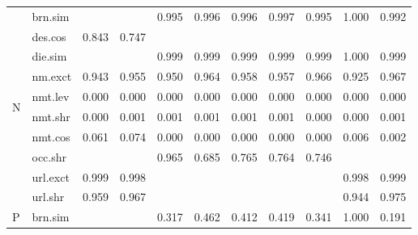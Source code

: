 \documentclass[epsfig,a4paper,11pt,titlepage,twoside,openany]{book}
\begin{document}
\begin{table}[H]
\begin{tabular}{ll|l|l|l|l|l|l|l|l|l|}
\multicolumn{1}{|l|}{\multirow{10}{*}{N}}       & brn.sim  &             &                & 0.995 & 0.996    & 0.996    & 0.997    & 0.995  & 1.000         & 0.992            \\ \cline{2-11} 
\multicolumn{1}{|l|}{}                                 & des.cos  & 0.843       & 0.747          &       &          &          &          &        &               &                  \\ \cline{2-11} 
\multicolumn{1}{|l|}{}                                 & die.sim  &             &                & 0.999 & 0.999    & 0.999    & 0.999    & 0.999  & 1.000         & 0.999            \\ \cline{2-11} 
\multicolumn{1}{|l|}{}                                 & nm.exct  & 0.943       & 0.955          & 0.950 & 0.964    & 0.958    & 0.957    & 0.966  & 0.925         & 0.967            \\ \cline{2-11} 
\multicolumn{1}{|l|}{}                                 & nmt.lev  & 0.000       & 0.000          & 0.000 & 0.000    & 0.000    & 0.000    & 0.000  & 0.000         & 0.000            \\ \cline{2-11} 
\multicolumn{1}{|l|}{}                                 & nmt.shr  & 0.000       & 0.001          & 0.001 & 0.001    & 0.001    & 0.001    & 0.000  & 0.000         & 0.001            \\ \cline{2-11} 
\multicolumn{1}{|l|}{}                                 & nmt.cos  & 0.061       & 0.074          & 0.000 & 0.000    & 0.000    & 0.000    & 0.000  & 0.006         & 0.002            \\ \cline{2-11} 
\multicolumn{1}{|l|}{}                                 & occ.shr  &             &                & 0.965 & 0.685    & 0.765    & 0.764    & 0.746  &               &                  \\ \cline{2-11} 
\multicolumn{1}{|l|}{}                                 & url.exct & 0.999       & 0.998          &       &          &          &          &        & 0.998         & 0.999            \\ \cline{2-11} 
\multicolumn{1}{|l|}{}                                 & url.shr  & 0.959       & 0.967          &       &          &          &          &        & 0.944         & 0.975            \\ \hline \hline
\multicolumn{1}{|l|}{\multirow{10}{*}{P}}       & brn.sim  &             &                & 0.317 & 0.462    & 0.412    & 0.419    & 0.341  & 1.000         & 0.191            \\ \cline{2-11} 

\end{tabular}
\end{table}
\end{document}
